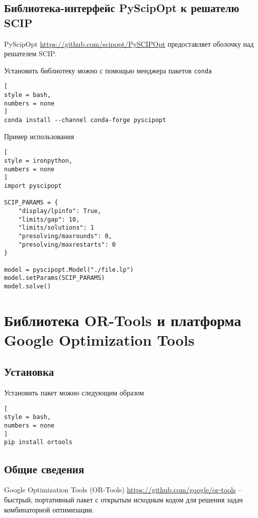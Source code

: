 \documentclass[%
	11pt,
	a4paper,
	utf8,
		]{article}
\begin{document}
\subsection{Библиотека-интерфейс PyScipOpt к решателю SCIP}

PyScipOpt \url{https://github.com/scipopt/PySCIPOpt} предоставляет оболочку над решателем SCIP.

Установить библиотеку можно с помощью менджера пакетов \texttt{conda}
\begin{lstlisting}[
style = bash,
numbers = none
]
conda install --channel conda-forge pyscipopt
\end{lstlisting}

Пример использования

\begin{lstlisting}[
style = ironpython,
numbers = none
]
import pyscipopt

SCIP_PARAMS = {
    "display/lpinfo": True,
    "limits/gap": 10,
    "limits/solutions": 1
    "presolving/maxrounds": 0,
    "presolving/maxrestarts": 0
}

model = pyscipopt.Model("./file.lp")
model.setParams(SCIP_PARAMS)
model.solve()
\end{lstlisting}

\section{Библиотека OR-Tools и платформа Google Optimization Tools}

\subsection{Установка}

Установить пакет можно следующим образом
\begin{lstlisting}[
style = bash,
numbers = none
]
pip install ortools
\end{lstlisting}

\subsection{Общие сведения}

Google Optimization Tools (OR-Tools) \url{https://github.com/google/or-tools} -- быстрый, портативный пакет с открытым исходным кодом для решения задач комбинаторной оптимизации.
\end{document}
